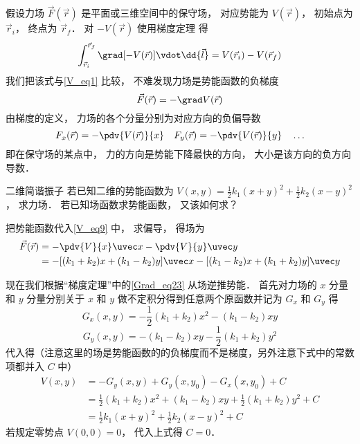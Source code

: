 假设力场 $\vec F(\vec r)$ 是平面或三维空间中的保守场， 对应势能为 $V(\vec r)$， 初始点为 $\vec r_i$， 终点为 $\vec r_f$． 对 $-V(\vec r)$ 使用梯度定理 得
\begin{equation}
\int_{\vec r_i}^{\vec r_f} \grad [-V(\vec r)] \vdot \dd{\vec l} = V(\vec r_i) - V(\vec r_f)
\end{equation}
我们把该式与\autoref{V_eq1} 比较， 不难发现力场是势能函数的负梯度
\begin{equation}
\vec F(\vec r) = - \grad V(\vec r)
\end{equation}
由梯度的定义， 力场的各个分量分别为对应方向的负偏导数
\begin{equation}\label{V_eq9}
F_x(\vec r) = -\pdv{V(\vec r)}{x} \quad F_y(\vec r) = -\pdv{V(\vec r)}{y} \quad \ldots
\end{equation}
即在保守场的某点中， 力的方向是势能下降最快的方向， 大小是该方向的负方向导数．

\begin{exam}{二维简谐振子}
若已知二维的势能函数为 $V(x,y) = \frac 12 k_1 (x+y)^2 + \frac 12 k_2 (x-y)^2$， 求力场． 若已知场函数求势能函数， 又该如何求？

把势能函数代入\autoref{V_eq9} 中， 求偏导， 得场为
\begin{equation}\begin{aligned}
\vec F(\vec r) &= -\pdv{V}{x} \uvec x - \pdv{V}{y} \uvec y\\
&= -[(k_1 + k_2) x  + (k_1-k_2) y] \uvec x - [(k_1-k_2)x + (k_1+k_2)y] \uvec y
\end{aligned}\end{equation}

现在我们根据“梯度定理”中的\autoref{Grad_eq23} 从场逆推势能． 首先对力场的 $x$ 分量和 $y$ 分量分别关于 $x$ 和 $y$ 做不定积分得到任意两个原函数并记为 $G_x$ 和 $G_y$ 得
\begin{equation}
G_x(x,y) = - \frac 12 (k_1 + k_2) x^2 -  (k_1-k_2) xy
\end{equation}
\begin{equation}
G_y(x,y) =  - (k_1 - k_2) xy - \frac 12 (k_1+k_2) y^2
\end{equation}
代入得（注意这里的场是势能函数的的负梯度而不是梯度，另外注意下式中的常数项都并入 $C$ 中）
\begin{equation}\begin{aligned}
V(x,y) &= -G_y(x,y) + G_y(x,y_0) - G_x(x,y_0) + C\\
&= \frac 12 (k_1 + k_2) x^2 + (k_1-k_2)xy + \frac 12 (k_1+k_2) y^2 + C\\
&= \frac 12 k_1 (x+y)^2 +\frac 12 k_2 (x-y)^2 + C
\end{aligned}\end{equation}
若规定零势点 $V(0,0) = 0$， 代入上式得 $C=0$．
\end{exam}

